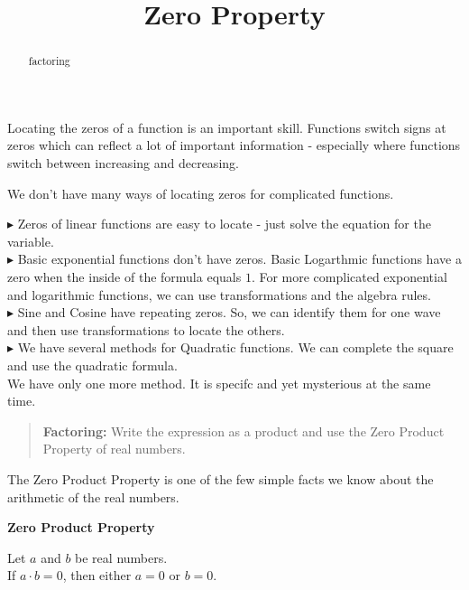 \documentclass{ximera}
\title{Zero Property}
\begin{document}
\begin{abstract}
factoring
\end{abstract}
\maketitle




Locating the zeros of a function is an important skill.  Functions switch signs at zeros which can reflect a lot of important information  - especially where functions switch between increasing and decreasing.

We don't have many ways of locating zeros for complicated functions.


$\blacktriangleright$ Zeros of linear functions are easy to locate - just solve the equation for the variable. \\


$\blacktriangleright$ Basic exponential functions don't have zeros.  Basic Logarthmic functions have a zero when the inside of the formula equals $1$. For more complicated exponential and logarithmic functions, we can use transformations and the algebra rules. \\

$\blacktriangleright$ Sine and Cosine have repeating zeros. So, we can identify them for one wave and then use transformations to locate the others. \\

$\blacktriangleright$ We have several methods for Quadratic functions.  We can complete the square and use the quadratic formula. \\



We have only one more method.  It is specifc and yet mysterious at the same time.



\begin{quote}
\textbf{Factoring: } Write the expression as a product and use the Zero Product Property of real numbers.
\end{quote}



The Zero Product Property is one of the few simple facts we know about the arithmetic of the real numbers.


\begin{definition} \textbf{Zero Product Property}

Let $a$ and $b$ be real numbers. \\

If $a \cdot b = 0$, then either $a=0$ or $b=0$.


\end{definition}
\end{document}
